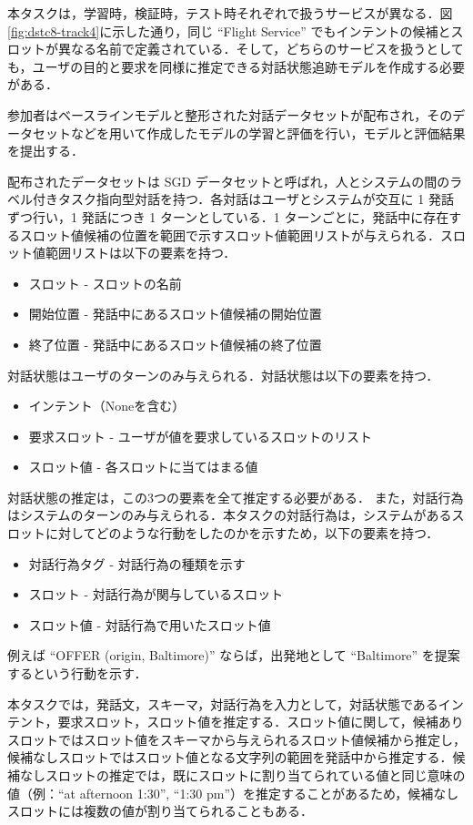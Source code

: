 本タスクは，学習時，検証時，テスト時それぞれで扱うサービスが異なる．図\ref{fig:dstc8-track4}に示した通り，同じ “Flight Service” でもインテントの候補とスロットが異なる名前で定義されている．そして，どちらのサービスを扱うとしても，ユーザの目的と要求を同様に推定できる対話状態追跡モデルを作成する必要がある．
\par 
参加者はベースラインモデルと整形された対話データセットが配布され，そのデータセットなどを用いて作成したモデルの学習と評価を行い，モデルと評価結果を提出する．
\par 
配布されたデータセットは SGD データセットと呼ばれ，人とシステムの間のラベル付きタスク指向型対話を持つ．各対話はユーザとシステムが交互に 1 発話ずつ行い，1 発話につき 1 ターンとしている．1 ターンごとに，発話中に存在するスロット値候補の位置を範囲で示すスロット値範囲リストが与えられる．スロット値範囲リストは以下の要素を持つ．
\begin{itemize}
    \item スロット - スロットの名前
    \item 開始位置 - 発話中にあるスロット値候補の開始位置
    \item 終了位置 - 発話中にあるスロット値候補の終了位置
\end{itemize}
対話状態はユーザのターンのみ与えられる．対話状態は以下の要素を持つ．
\begin{itemize}
    \item インテント（Noneを含む）
    \item 要求スロット - ユーザが値を要求しているスロットのリスト
    \item スロット値 - 各スロットに当てはまる値
\end{itemize}
対話状態の推定は，この3つの要素を全て推定する必要がある．
また，対話行為はシステムのターンのみ与えられる．本タスクの対話行為は，システムがあるスロットに対してどのような行動をしたのかを示すため，以下の要素を持つ．
\begin{itemize}
    \item 対話行為タグ - 対話行為の種類を示す
    \item スロット - 対話行為が関与しているスロット
    \item スロット値 - 対話行為で用いたスロット値
\end{itemize}
例えば “OFFER (origin, Baltimore)” ならば，出発地として “Baltimore” を提案するという行動を示す．
\par
本タスクでは，発話文，スキーマ，対話行為を入力として，対話状態であるインテント，要求スロット，スロット値を推定する．スロット値に関して，候補ありスロットではスロット値をスキーマから与えられるスロット値候補から推定し，候補なしスロットではスロット値となる文字列の範囲を発話中から推定する．候補なしスロットの推定では，既にスロットに割り当てられている値と同じ意味の値（例：“at afternoon 1:30”, “1:30 pm”）を推定することがあるため，候補なしスロットには複数の値が割り当てられることもある．